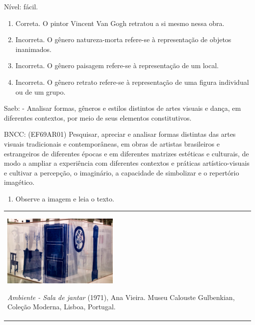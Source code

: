 \begin{escolha}
{{{{{{{{Nível: fácil.

\begin{enumerate}
\def\labelenumi{\alph{enumi})}
\item
  Correta. O pintor Vincent Van Gogh retratou a si mesmo nessa obra.
\item
  Incorreta. O gênero natureza-morta refere-se à representação de
  objetos inanimados.
\item
  Incorreta. O gênero paisagem refere-se à representação de um local.
\item
  Incorreta. O gênero retrato refere-se à representação de uma figura
  individual ou de um grupo.
\end{enumerate}

Saeb: - Analisar formas, gêneros e estilos distintos de artes visuais e
dança, em diferentes contextos, por meio de seus elementos
constitutivos.

BNCC: (EF69AR01) Pesquisar, apreciar e analisar formas distintas das
artes visuais tradicionais e contemporâneas, em obras de artistas
brasileiros e estrangeiros de diferentes épocas e em diferentes matrizes
estéticas e culturais, de modo a ampliar a experiência com diferentes
contextos e práticas artístico-visuais e cultivar a percepção, o
imaginário, a capacidade de simbolizar e o repertório imagético.

\begin{enumerate}
\def\labelenumi{\arabic{enumi}.}
\item
  Observe a imagem e leia o texto.
\end{enumerate}

\begin{longtable}[]{@{}ll@{}}
\toprule
\begin{minipage}[t]{0.48\columnwidth}\raggedright\strut
\includegraphics[width=2.23958in,height=1.37500in]{media/image29.png}

\emph{Ambiente - Sala de jantar} (1971), Ana Vieira. Museu Calouste
Gulbenkian, Coleção Moderna, Lisboa, Portugal.


\end{minipage}
\end{longtable}}}}}}}}}
\end{escolha}
